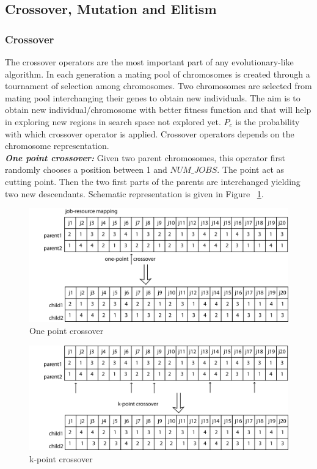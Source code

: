 \subsection{Crossover, Mutation and Elitism}
\subsubsection{Crossover}
The crossover operators are the most important part of any evolutionary-like algorithm. In each generation a mating pool of chromosomes is created through a tournament of selection among chromosomes. Two chromosomes are selected from mating pool interchanging their genes to obtain new individuals. The aim is to obtain new individual/chromosome with better fitness function and that will help in exploring new regions in search space not explored yet. $P_c$ is the probability with which crossover operator is applied.
Crossover operators depends on the chromosome representation.\\
\textbf{\emph{One point crossover: }} Given two parent chromosomes, this operator first randomly chooses a position between 1 and $NUM\_JOBS$. The point act as cutting point. Then the two first parts of the parents are interchanged yielding two new descendants. Schematic representation is given in Figure ~\ref{1pointxover}.\\
\begin{figure}[!h]
    \includegraphics[width=1.0\columnwidth]{crossover1}
    \caption{One point crossover}
	\label{1pointxover}
\end{figure}
\begin{figure}[!h]
    \includegraphics[width=1.0\columnwidth]{crossover2}
    \caption{k-point crossover}
	\label{kpointxover}
\end{figure}
